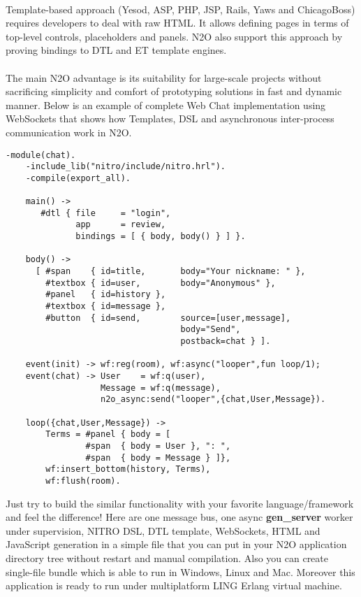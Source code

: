 \paragraph{}
Template-based approach (Yesod, ASP, PHP, JSP, Rails, Yaws and ChicagoBoss)
requires developers to deal with raw HTML. It allows
defining pages in terms of top-level controls, placeholders
and panels. N2O also support this approach by proving bindings
to DTL and ET template engines.

\paragraph{}
The main N2O advantage is its suitability for large-scale projects
without sacrificing simplicity and comfort of prototyping solutions
in fast and dynamic manner. Below is an example of complete Web Chat
implementation using WebSockets that shows how  Templates, DSL and
asynchronous inter-process communication work in N2O.

\newpage
\vspace{1\baselineskip}
\begin{lstlisting}[caption=chat.erl]
    -module(chat).
    -include_lib("nitro/include/nitro.hrl").
    -compile(export_all).

    main() ->
       #dtl { file     = "login",
              app      = review,
              bindings = [ { body, body() } ] }.

    body() ->
      [ #span    { id=title,       body="Your nickname: " },
        #textbox { id=user,        body="Anonymous" },
        #panel   { id=history },
        #textbox { id=message },
        #button  { id=send,        source=[user,message],
                                   body="Send",
                                   postback=chat } ].

    event(init) -> wf:reg(room), wf:async("looper",fun loop/1);
    event(chat) -> User    = wf:q(user),
                   Message = wf:q(message),
                   n2o_async:send("looper",{chat,User,Message}).

    loop({chat,User,Message}) ->
        Terms = #panel { body = [
                #span  { body = User }, ": ",
                #span  { body = Message } ]},
        wf:insert_bottom(history, Terms),
        wf:flush(room).
\end{lstlisting}
\vspace{1\baselineskip}

Just try to build the similar functionality with your favorite
language/framework and feel the difference! Here are one message bus,
one async {\bf gen\_server} worker under supervision, NITRO DSL, DTL template,
WebSockets, HTML and JavaScript generation in a simple file that you can
put in your N2O application directory tree without restart and
manual compilation. Also you can create single-file bundle
which is able to run in Windows, Linux and Mac. Moreover this
application is ready to run under multiplatform LING Erlang virtual machine.

